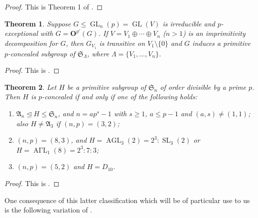 \documentclass[12pt]{amsart}
\theoremstyle{theorem}
\newtheorem{teo}{Theorem}
\theoremstyle{definition}
\newcommand{\fA} {\mathfrak A}
\newcommand{\fS} {\mathfrak S}
\newcommand{\bO}{{\mathbf O}}
\newcommand{\GL}{\operatorname{GL}}
\newcommand{\AGL}{\operatorname{AGL}}
\newcommand{\AGaL}{\operatorname{A\Gamma L}}
\newcommand{\SL}{\operatorname{SL}}
\begin{document}
	\begin{proof}
		This is Theorem 1 of \cite{GLPST}.
	\end{proof}
	
	\begin{teo}   \label{t3}
		Suppose $G\leq \GL_n(p)=\GL(V)$ is irreducible and $p$-exceptional with
		$G=\bO^{p'}(G)$. If $V=V_1\oplus\cdots\oplus V_n$ ($n>1$) is an
		imprimitivity decomposition for $G$, then $G_{V_1}$ is transitive on
		$V_1\setminus\{0\}$ and $G$ induces a primitive $p$-concealed subgroup of
		$\fS_\Lambda$, where $\Lambda=\{V_1,\dots, V_n\}$.
	\end{teo}
	
	\begin{proof}
		This is \cite[Thm~3]{GLPST}.
	\end{proof}
	
	\begin{teo}
		
		\label{t2}
		Let $H$ be a primitive subgroup of $\fS_n$ of order divisible by a prime $p$.
		Then $H$ is $p$-concealed if and only if one of the following holds:
		\begin{enumerate}
			\item $\fA_n\trianglelefteq H\leq \fS_n$, and $n=ap^s-1$ with $s\geq 1$,
			$a\leq p-1$ and $(a,s)\neq(1,1)$; also $H\neq\fA_3$ if $(n,p)=(3,2)$;
			\item $(n,p)=(8,3)$, and $H=\AGL_3(2)=2^3:\SL_3(2)$ or
			$H=\AGaL_1(8)=2^3:7:3$;
			\item $(n,p)=(5,2)$ and $H=D_{10}$. 
		\end{enumerate}
	\end{teo}
	
	\begin{proof}
		This is \cite[Thm~2]{GLPST}.
	\end{proof}
	
	One consequence of this latter classification which will be of particular use to us is the following variation of \cite[Lemma 3.4]{MinimalHeights}.
		
\end{document}
